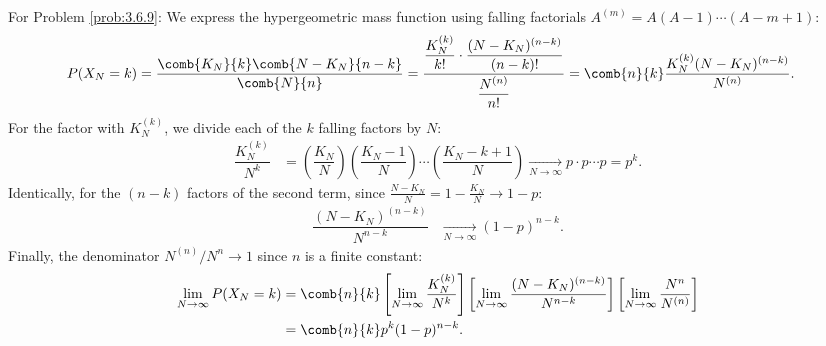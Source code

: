 \begin{solucion}
	\label{sol:3.6.9}
	For Problem \ref{prob:3.6.9}:
	We express the hypergeometric mass function using falling factorials $A^{(m)} = A(A-1)\cdots(A-m+1)$:
	\begin{align*}
		P(X_N = k) &= \dfrac{\comb{K_N}{k}\comb{N-K_N}{n-k}}{\comb{N}{n}} = \dfrac{\dfrac{K_N^{(k)}}{k!} \cdot \dfrac{(N-K_N)^{(n-k)}}{(n-k)!}}{\dfrac{N^{(n)}}{n!}} = \comb{n}{k} \dfrac{K_N^{(k)} (N-K_N)^{(n-k)}}{N^{(n)}}.
	\end{align*}
	For the factor with $K_N^{(k)}$, we divide each of the $k$ falling factors by $N$:
	\begin{align*}
		\dfrac{K_N^{(k)}}{N^k} &= \left(\dfrac{K_N}{N}\right)\left(\dfrac{K_N-1}{N}\right)\cdots\left(\dfrac{K_N-k+1}{N}\right) \xrightarrow[N \to \infty]{} p \cdot p \cdots p = p^k.
	\end{align*}
	Identically, for the $(n-k)$ factors of the second term, since $\frac{N-K_N}{N} = 1 - \frac{K_N}{N} \to 1-p$:
	\begin{align*}
		\dfrac{(N-K_N)^{(n-k)}}{N^{n-k}} &\xrightarrow[N \to \infty]{} (1-p)^{n-k}.
	\end{align*}
	Finally, the denominator $N^{(n)}/N^n \to 1$ since $n$ is a finite constant:
	\begin{align*}
		\lim_{N \to \infty} P(X_N = k) &= \comb{n}{k} \left[ \lim_{N \to \infty} \dfrac{K_N^{(k)}}{N^k} \right] \left[ \lim_{N \to \infty} \dfrac{(N-K_N)^{(n-k)}}{N^{n-k}} \right] \left[ \lim_{N \to \infty} \dfrac{N^n}{N^{(n)}} \right] \\
		&= \comb{n}{k} p^k (1-p)^{n-k}.
	\end{align*}
\end{solucion}

